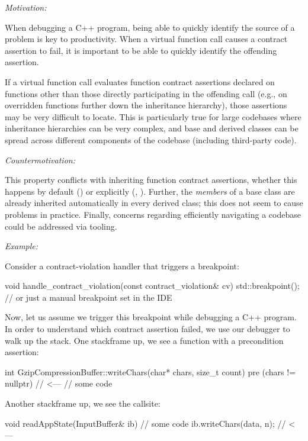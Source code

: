 \emph{Motivation:}

When debugging a C++ program, being able to quickly identify the source of a problem is key to productivity. When a virtual function call causes a contract assertion to fail, it is important to be able to quickly identify the offending assertion.

If a virtual function call evaluates function contract assertions declared on functions other than those directly participating in the offending call (e.g., on overridden functions further down the inheritance hierarchy), those assertions may be very difficult to locate. This is particularly true for large codebases where inheritance hierarchies can be very complex, and base and derived classes can be spread across different components of the codebase (including third-party code).

\emph{Countermotivation:}

This property conflicts with inheriting function contract assertions, whether this happens by default () or explicitly (, ). Further, the \emph{members} of a base class are already inherited automatically in every derived class; this does not seem to cause problems in practice. Finally, concerns regarding efficiently navigating a codebase could be addressed via tooling.

\emph{Example:}

Consider a contract-violation handler that triggers a breakpoint:

\begin{codeblock}
void handle_contract_violation(const contract_violation& cv) {
    std::breakpoint(); // or just a manual breakpoint set in the IDE
}
\end{codeblock}

Now, let us assume we trigger this breakpoint while debugging a C++ program. In order to understand which contract assertion failed, we use our debugger to walk up the stack.  One stackframe up, we see a function with a precondition assertion:

\begin{codeblock}
int GzipCompressionBuffer::writeChars(char* chars, size_t count)
pre (chars != nullptr) {   // <---
  // some code
}
\end{codeblock}

Another stackframe up, we see the callsite:

\begin{codeblock}
void readAppState(InputBuffer& ib) {
  // some code
  ib.writeChars(data, n);   // <---
}
\end{codeblock}

